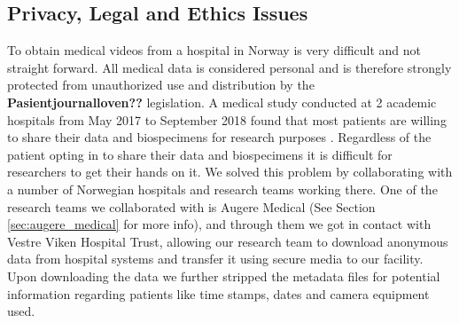\documentclass[thesis.tex]{subfiles}
\begin{document}
\subsection{Privacy, Legal and Ethics Issues}
To obtain medical videos from a hospital in Norway is very difficult and not straight forward. All medical data is considered personal and is therefore strongly protected from unauthorized use and distribution by the \textbf{Pasientjournalloven??} legislation.
A medical study conducted at 2 academic hospitals from May 2017 to September 2018 found that most patients are willing to share their data and biospecimens for research purposes \cite{PatientPerspectives19}. Regardless of the patient opting in to share their data and biospecimens it is difficult for researchers to get their hands on it. 
We solved this problem by collaborating with a number of Norwegian hospitals and research teams working there. One of the research teams we collaborated with is Augere Medical (See Section \ref{sec:augere_medical} for more info), and through them we got in contact with Vestre Viken Hospital Trust, allowing our research team to download anonymous data from hospital systems and transfer it using secure media to our facility. Upon downloading the data we further stripped the metadata files for potential information regarding patients like time stamps, dates and camera equipment used.

\end{document}
